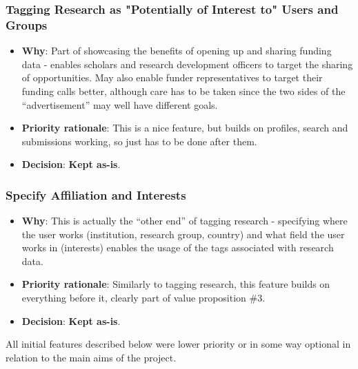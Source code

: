 \subsubsection{Tagging Research as "Potentially of Interest to" Users and Groups}
\begin{itemize}
 \item \textbf{Why}: Part of showcasing the benefits of opening up and sharing funding data - enables scholars and research development officers to target the sharing of opportunities. May also enable funder representatives to target their funding calls better, although care has to be taken since the two sides of the ``advertisement'' may well have different goals.
 \item \textbf{Priority rationale}: This is a nice feature, but builds on profiles, search and submissions working, so just has to be done after them.
 \item \textbf{Decision}: \textbf{Kept as-is}.
\end{itemize}

\subsubsection{Specify Affiliation and Interests}
\begin{itemize}
 \item \textbf{Why}: This is actually the ``other end'' of tagging research - specifying where the user works (institution, research group, country) and what field the user works in (interests) enables the usage of the tags associated with research data.
 \item \textbf{Priority rationale}: Similarly to tagging research, this feature builds on everything before it, clearly part of value proposition \#3.
 \item \textbf{Decision}: \textbf{Kept as-is}.
\end{itemize}

All initial features described below were lower priority or in some way optional in relation to the main aims of the project.

